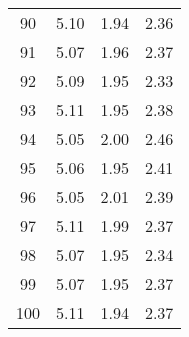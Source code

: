 \documentclass[a4paper]{article}
\begin{document}
\begin{minipage}{\textwidth}
\begin{tabular}{ c c c c }
                       90 &       5.10 &   1.94 &      2.36 \\
                       91 &       5.07 &   1.96 &      2.37 \\
                       92 &       5.09 &   1.95 &      2.33 \\
                       93 &       5.11 &   1.95 &      2.38 \\
                       94 &       5.05 &   2.00 &      2.46 \\
                       95 &       5.06 &   1.95 &      2.41 \\
                       96 &       5.05 &   2.01 &      2.39 \\
                       97 &       5.11 &   1.99 &      2.37 \\
                       98 &       5.07 &   1.95 &      2.34 \\
                       99 &       5.07 &   1.95 &      2.37 \\
                      100 &       5.11 &   1.94 &      2.37 \\
            \end{tabular}
        \end{minipage}
\end{document}
